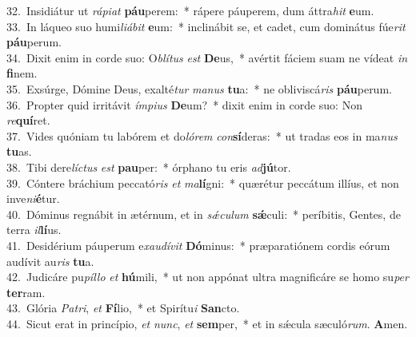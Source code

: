 {32.~}Insidiátur ut \textit{rá}\textit{pi}\textit{at} \textbf{páu}perem:~* rápere páuperem, dum áttra\textit{hit} \textbf{e}um.\\
{33.~}In láqueo suo humi\textit{li}\textit{á}\textit{bit} \textbf{e}um:~* inclinábit se, et cadet, cum dominátus fúe\textit{rit} \textbf{páu}perum.\\
{34.~}Dixit enim in corde suo: O\textit{blí}\textit{tus} \textit{est} \textbf{De}us,~* avértit fáciem suam ne vídeat \textit{in} \textbf{fi}nem.\\
{35.~}Exsúrge, Dómine Deus, exalté\textit{tur} \textit{ma}\textit{nus} \textbf{tu}a:~* ne obliviscá\textit{ris} \textbf{páu}perum.\\
{36.~}Propter quid irritávit \textit{ím}\textit{pi}\textit{us} \textbf{De}um?~* dixit enim in corde suo: Non \textit{re}\textbf{quí}ret.\\
{37.~}Vides quóniam tu labórem et do\textit{ló}\textit{rem} \textit{con}\textbf{sí}deras:~* ut tradas eos in ma\textit{nus} \textbf{tu}as.\\
{38.~}Tibi dere\textit{lí}\textit{ctus} \textit{est} \textbf{pau}per:~* órphano tu eris \textit{ad}\textbf{jú}tor.\\
{39.~}Cóntere bráchium peccató\textit{ris} \textit{et} \textit{ma}\textbf{lí}gni:~* quærétur peccátum illíus, et non inve\textit{ni}\textbf{é}tur.\\
{40.~}Dóminus regnábit in ætérnum, et in \textit{sǽ}\textit{cu}\textit{lum} \textbf{sǽ}culi:~* períbitis, Gentes, de terra \textit{il}\textbf{lí}us.\\
{41.~}Desidérium páuperum e\textit{xau}\textit{dí}\textit{vit} \textbf{Dó}minus:~* præparatiónem cordis eórum audívit au\textit{ris} \textbf{tu}a.\\
{42.~}Judicáre pu\textit{píl}\textit{lo} \textit{et} \textbf{hú}mili,~* ut non appónat ultra magnificáre se homo su\textit{per} \textbf{ter}ram.\\
{43.~}Glória \textit{Pa}\textit{tri}, \textit{et} \textbf{Fí}lio,~* et Spirítu\textit{i} \textbf{San}cto.\\
{44.~}Sicut erat in princípio, \textit{et} \textit{nunc}, \textit{et} \textbf{sem}per,~* et in sǽcula sæculó\textit{rum}. \textbf{A}men.\\
